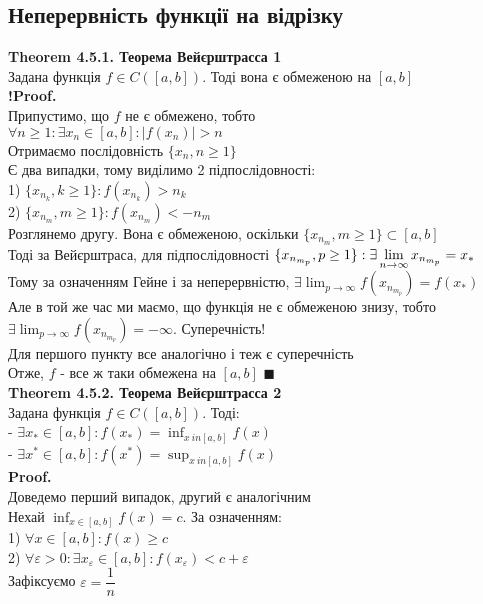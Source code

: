 \documentclass[a4paper, 14pt]{extarticle}
\def\huge{\displaystyle}
\def\bigline{\vspace{5mm}\\}
\def\th#1{\textbf{Theorem {#1}}}
\def\proof{\textbf{Proof.}\\}
\def\contra{\textbf{!Proof.}\\}
\def\bigline{\vspace{5mm}\\}
\def\qed{$\blacksquare$}
\begin{document}
\subsection{Неперервність функції на відрізку}
\th{4.5.1. Теорема Вейєрштрасса 1}\\
Задана функція $f \in C([a,b])$. Тоді вона є обмеженою на $[a,b]$\\
\contra
Припустимо, що $f$ не є обмежено, тобто\\
$\forall n \geq 1: \exists x_n \in [a,b]: |f(x_n)| > n$\\
Отримаємо послідовність $\{x_n,n \geq 1\}$\\
Є два випадки, тому виділимо 2 підпослідовності:\\
1) $\{x_{n_k}, k \geq 1\}: f(x_{n_k})>n_k$\\
2) $\{x_{n_m}, m \geq 1\}: f(x_{n_m})<-n_m$\\
Розглянемо другу. Вона є обмеженою, оскільки $\{x_{n_m}, m \geq 1\} \subset [a,b]$\\
Тоді за Вейєрштраса, для підпослідовності $\{x_{n_{m_p}}, p \geq 1\}: \\ \exists \huge \lim_{n \to \infty} x_{n_{m_p}} =x_*$\\
Тому за означенням Гейне і за неперервністю, $\exists \huge \lim_{p \to \infty} f(x_{n_{m_p}}) = f(x_*)$\\
Але в той же час ми маємо, що функція не є обмеженою знизу, тобто $\exists \huge \lim_{p \to \infty} f(x_{n_{m_p}}) = -\infty$. Суперечність!\\
Для першого пункту все аналогічно і теж є суперечність\\
Отже, $f$ - все ж таки обмежена на $[a,b]$ \qed
\bigline
\th{4.5.2. Теорема Вейєрштрасса 2}\\
Задана функція $f \in C([a,b])$. Тоді:\\
- $\huge \exists x_* \in [a,b]: f(x_*) = \inf_{x \ in [a,b]} f(x)$\\
- $\huge \exists x^* \in [a,b]: f(x^*) = \sup_{x \ in [a,b]} f(x)$\\
\proof
Доведемо перший випадок, другий є аналогічним\\
Нехай $\huge \inf_{x \in [a,b]} f(x) = c$. За означенням:\\
1) $\forall x \in [a,b]: f(x) \geq c$\\
2) $\forall \varepsilon > 0: \exists x_{\varepsilon} \in [a,b]: f(x_{\varepsilon}) < c + \varepsilon$\\
Зафіксуємо $\varepsilon = \dfrac{1}{n}$\\
\end{document}
